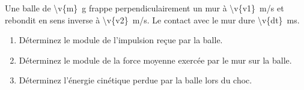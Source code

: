 Une balle de \qty{\v{m}}{g} frappe perpendiculairement un mur à \qty{\v{v1}}{m/s} et rebondit en sens inverse à \qty{\v{v2}}{m/s}. Le contact avec le mur dure \qty{\v{dt}}{ms}.

\begin{enumerate}[label=\alph*)]
    \item Déterminez le module de l'impulsion reçue par la balle.
    \item Déterminez le module de la force moyenne exercée par le mur sur la balle.
    \item Déterminez l'énergie cinétique perdue par la balle lors du choc.
\end{enumerate}
